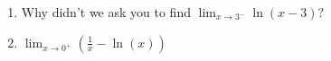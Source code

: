 \documentclass[11pt,fleqn]{article}
\begin{document}
\begin{enumerate}
\begin{enumerate}
\item Why didn't we ask you to find $\displaystyle{\lim_{x \to 3^-}\ln(x-3)}$?\\
\vfill

\item $\displaystyle{\lim_{x \to 0^+}\left(\frac{1}{x}-\ln(x)\right)}$\\
\vfill

\end{enumerate}
\end{enumerate}
\end{document}
